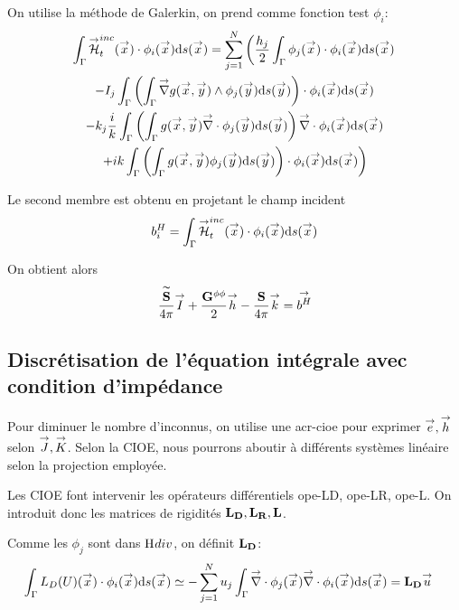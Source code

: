       On utilise la méthode de Galerkin, on prend comme fonction test \(\phi_i\): 
      \begin{multline}
        \int_\Gamma \vH^{inc}_t(\vx) \cdot \phi_i(\vx) \dd{s}(\vx) = \sum_{j=1}^{N} \left(
          \frac{h_j}{2}\int_\Gamma \phi_j(\vx) \cdot \phi_i(\vx) \dd{s}(\vx) \right. \\
          -  I_j\int_\Gamma  \left(\int_\Gamma \vgrad g(\vx,\vy) \pvect \phi_j(\vy) \dd{s}(\vy) \right) \cdot \phi_i(\vx) \dd{s}(\vx) \\
          - k_j\frac{i}{k} \int_\Gamma \left(\int_\Gamma g(\vx,\vy)\vdiv \phi_j(\vy) \dd{s}(\vy) \right) \vdiv \phi_i(\vx) \dd{s}(\vx) \\
        \left.
          + ik\int_\Gamma \left(\int_\Gamma g(\vx,\vy)\phi_j(\vy)\dd{s}{(\vy)}\right)\cdot \phi_i(\vx)\dd{s}(\vx)
        \right)
      \end{multline}

      Le second membre est obtenu en projetant le champ incident 
      \begin{equation}
        b_i^H = \int_\Gamma \vH^{inc}_t(\vx) \cdot \phi_i(\vx)\dd{s}(\vx)
      \end{equation}

      On obtient alors 
      \begin{equation}
        \frac{\mSt}{4\pi}\vect{I} 
        + \frac{\mG{\phi}{\phi}}{2}\vect{h}
        - \frac{\mS}{4\pi}\vect{k} 
        = \vect{b^H}
      \end{equation}

  \subsection{Discrétisation de l'équation intégrale avec condition d'impédance}
    Pour diminuer le nombre d'inconnus, on utilise une \gls{acr-cioe} pour exprimer \(\vect{e}, \vect{h}\) selon \(\vect{J}, \vect{K}\). Selon la CIOE, nous pourrons aboutir à différents systèmes linéaire selon la projection employée. 

    Les CIOE font intervenir les opérateurs différentiels \gls{ope-LD}, \gls{ope-LR}, \gls{ope-L}. On introduit donc les matrices de rigidités \(\mLD,\mLR,\mL\).

    Comme les \(\phi_j\) sont dans \(\Hdiv\), on définit \(\mLD\):
    \begin{align}
      \int_\Gamma L_D(U)(\vx) \cdot \phi_i(\vx) \dd{s}(\vx)  
        & \simeq - \sum_{j=1}^N u_j \int_\Gamma \vdiv \phi_j(\vx) \vdiv \phi_i(\vx) \dd{s}(\vx) = \mLD \vu
    \end{align}

